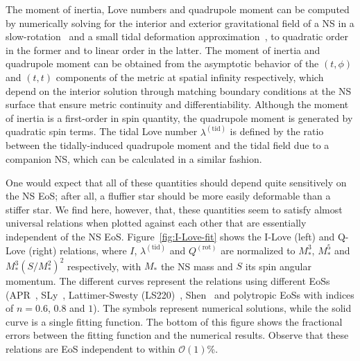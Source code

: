 \documentclass[aps,twocolumn,nofootinbib,showpacs,superscriptaddress,hyperref]{revtex4-1}
\newcommand{\NS}{*}
\newcommand{\rot}{\mathrm{(rot)}}
\newcommand{\mrm}{\mathrm}
\begin{document}
The moment of inertia, Love numbers and quadrupole moment can be computed by numerically solving for the interior and exterior gravitational field of a NS in a slow-rotation~\cite{hartle1967} and a small tidal deformation approximation~\cite{hinderer-love}, to quadratic order in the former and to linear order in the latter. The moment of inertia and quadrupole moment can be obtained from the asymptotic behavior of the $(t,\phi)$ and $(t,t)$ components of the metric at spatial infinity respectively, which depend on the interior solution through matching boundary conditions at the NS surface that ensure metric continuity and differentiability. Although the moment of inertia is a first-order in spin quantity, the quadrupole moment is generated by quadratic spin terms. The tidal Love number $\lambda^\mrm{(tid)}$ is defined by the ratio between the tidally-induced quadrupole moment and the tidal field due to a companion NS, which can be calculated in a similar fashion.

One would expect that all of these quantities should depend quite sensitively on the NS EoS; after all, a fluffier star should be more easily deformable than a stiffer star. We find here, however, that, these quantities seem to satisfy almost universal relations when plotted against each other that are essentially independent of the NS EoS. Figure~\ref{fig:I-Love-fit} shows the I-Love (left) and Q-Love (right) relations, where $I$, $\lambda^\mrm{(tid)}$ and $Q^\rot$ are normalized to $M_{\NS}^{3}$, $M_{\NS}^{5}$ and $M_{\NS}^{3} (S/M_{\NS}^{2})^{2}$ respectively, with $M_{\NS}$ the NS mass and $S$ its spin angular momentum. The different curves represent the relations using different EoSs (APR~\cite{APR}, SLy~\cite{SLy}, Lattimer-Swesty (LS220)~\cite{LS}, Shen~\cite{Shen1,Shen2} and polytropic EoSs with indices of $n=0.6$, $0.8$ and $1$). The symbols represent numerical solutions, while the solid curve is a single  fitting function. The bottom of this figure shows the fractional errors between the fitting function and the numerical results. Observe that these relations are EoS independent to within $\mathcal{O}(1)$\%. 
\end{document}
